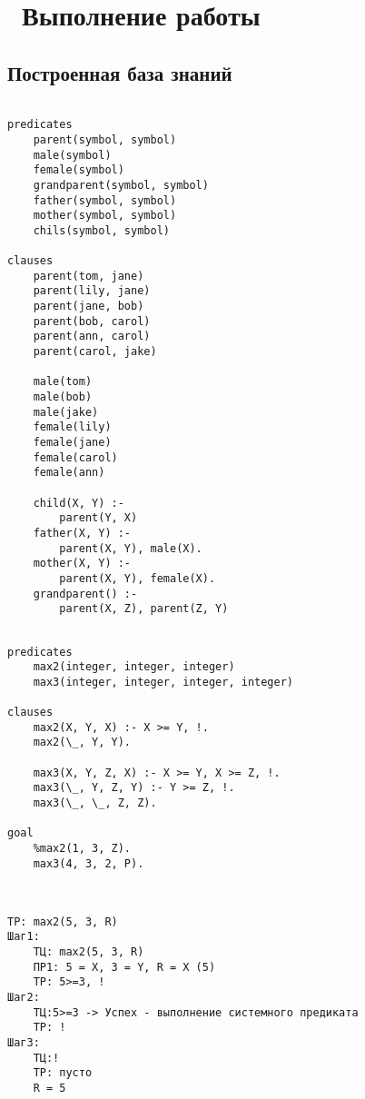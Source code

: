 \chapter{ Выполнение работы}
\label{cha:analysis}

\section{ Построенная база знаний}

\begin{lstlisting}[style=lispStyle, caption={ База знаний - "предки"},
                    label={lst:family}]

predicates
    parent(symbol, symbol)
    male(symbol)
    female(symbol)
    grandparent(symbol, symbol)
    father(symbol, symbol)
    mother(symbol, symbol)
    chils(symbol, symbol)

clauses
    parent(tom, jane)
    parent(lily, jane)
    parent(jane, bob)
    parent(bob, carol)
    parent(ann, carol)
    parent(carol, jake)

    male(tom)
    male(bob)
    male(jake)
    female(lily)
    female(jane)
    female(carol)
    female(ann)

    child(X, Y) :-
        parent(Y, X)
    father(X, Y) :-
        parent(X, Y), male(X).
    mother(X, Y) :-
        parent(X, Y), female(X).
    grandparent() :-
        parent(X, Z), parent(Z, Y)

\end{lstlisting}

\begin{lstlisting}[style=lispStyle, caption={ База знаний нахождения максимума среди двух элементов и трех.},
                    label={lst:max}]

predicates
    max2(integer, integer, integer)
    max3(integer, integer, integer, integer)

clauses
    max2(X, Y, X) :- X >= Y, !.
    max2(\_, Y, Y).

    max3(X, Y, Z, X) :- X >= Y, X >= Z, !.
    max3(\_, Y, Z, Y) :- Y >= Z, !.
    max3(\_, \_, Z, Z).

goal
    %max2(1, 3, Z).
    max3(4, 3, 2, P).


\end{lstlisting}


\begin{lstlisting}[style=lispStyle, caption={ Резольвента для правила max2.},
                    label={lst:resolve}]

ТР: max2(5, 3, R)
Шаг1:
    ТЦ: max2(5, 3, R)
    ПР1: 5 = X, 3 = Y, R = X (5)
    ТР: 5>=3, !
Шаг2:
    ТЦ:5>=3 -> Успех - выполнение системного предиката
    ТР: !
Шаг3:
    ТЦ:!
    ТР: пусто
    R = 5

\end{lstlisting}


